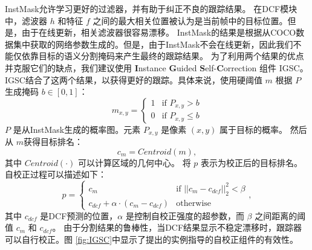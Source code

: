 InstMask允许学习更好的过滤器，并有助于纠正不良的跟踪结果。
在DCF模块中，滤波器 $h$ 和特征 $f$ 之间的最大相关位置被认为是当前帧中的目标位置。但是，由于在线更新，相关滤波器很容易漂移。
InstMask的结果是根据从COCO数据集中获取的网络参数生成的。但是，由于InstMask不会在线更新，因此我们不能仅依靠目标的语义分割掩码来产生最终的跟踪结果。
为了利用两个结果的优点并克服它们的缺点，我们建议使用 \textbf{I}nstance \textbf{G}uided \textbf{S}elf-\textbf{C}orrection 组件 IGSC。IGSC结合了这两个结果，以获得更好的跟踪。具体来说，使用硬阈值 $m$ 根据 $P$ 生成掩码 $b \in [0, 1] $：
\begin{equation}
m_{x,y} = \left\{ \begin{array}{ll}
 1 & \textrm{if $P_{x,y} > b$}\\
 0 & \textrm{if $P_{x,y} \le b$}
 \end{array} \right.
\end{equation}
$P$ 是从InstMask生成的概率图。元素 $P_{x,y}$ 是像素 $(x,y)$ 属于目标的概率。
然后从 $m$获得目标排名：
\begin{equation}
c_{m} = Centroid(m),
\end{equation}
其中 $Centroid(\mathord{\cdot})$ 可以计算区域的几何中心。
将 $p$ 表示为校正后的目标排名。
自校正过程可以描述如下：
\begin{equation}
p = \left\{ \begin{array}{ll}
 c_{m} & \textrm{if $||c_{m}-c_{dcf}||_2^2 < \beta$}\\
 c_{dcf} + \alpha \cdot (c_{m}-c_{dcf}) & \textrm{otherwise}
 \end{array} \right.,
\end{equation}
其中 $c_{dcf}$ 是DCF预测的位置，$\alpha$ 是控制自校正强度的超参数，而 $\beta$ 之间距离的阈值 $c_{m}$ 和 $c_{dcf}$。
由于分割结果的鲁棒性，当DCF结果显示不稳定漂移时，跟踪器可以自行校正。图 \ref{fig:IGSC}中显示了提出的实例指导的自校正组件的有效性。

